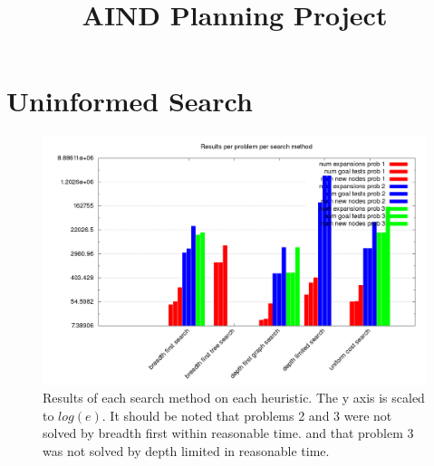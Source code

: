 \documentclass[11pt]{article}
\title{\textbf{AIND Planning Project}}
\begin{document}
\maketitle

\newpage

\section{Uninformed Search}


    {}%
\begin{figure}[h]
	\includegraphics[scale=0.32]{results_summary.png}
	\caption{Results of each search method on each heuristic. The y axis is scaled to $log(e)$.
			 It should be noted that problems 2 and 3 were not solved by breadth first within reasonable time. and that problem 3 was not solved by depth limited in reasonable time.}
	\label{results}
\end{figure}
\end{document}
